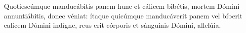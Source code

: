 Quotiescúmque manducábitis panem hunc et cálicem bibétis, mortem Dómini annuntiábitis, donec véniat: ítaque quicúmque manducáverit panem vel bíberit calicem Dómini indígne, reus erit córporis et sánguinis Dómini, allelúia.
